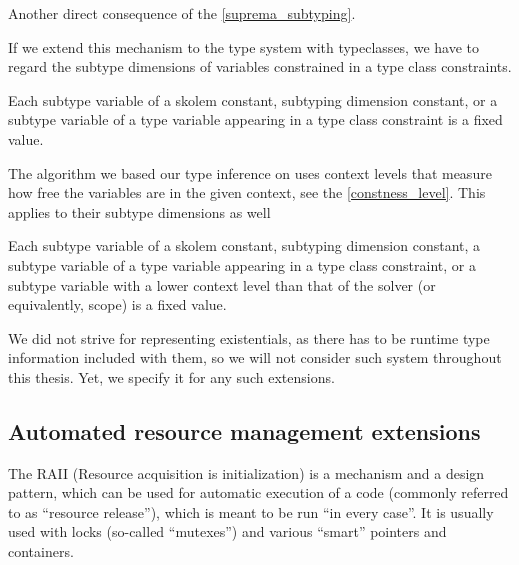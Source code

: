\begin{remark}
    Another direct consequence of the \cref{suprema_subtyping}.
\end{remark}

If we extend this mechanism to the type system with typeclasses, we have to regard the subtype dimensions of variables constrained in a type class constraints.

\begin{defn}
    Each subtype variable of a skolem constant, subtyping dimension constant, or a subtype variable of a type variable appearing in a type class constraint is a fixed value.
\end{defn}


The algorithm we based our type inference on uses context levels that measure how free the variables are in the given context, see the \cref{constness_level}. This applies to their subtype dimensions as well

\begin{defn}
    Each subtype variable of a skolem constant, subtyping dimension constant, a subtype variable of a type variable appearing in a type class constraint, or a subtype variable with a lower context level than that of the solver (or equivalently, scope) is a fixed value.
\end{defn}

We did not strive for representing existentials, as there has to be runtime type information included with them, so we will not consider such system throughout this thesis. Yet, we specify it for any such extensions.


\subsection{Automated resource management extensions}
\label{RAII}




The RAII (Resource acquisition is initialization) is a mechanism and a design pattern, which can be used for automatic execution of a code (commonly referred to as ``resource release''), which is meant to be run ``in every case''. It is usually used with locks (so-called ``mutexes'') and various ``smart'' pointers and containers.


